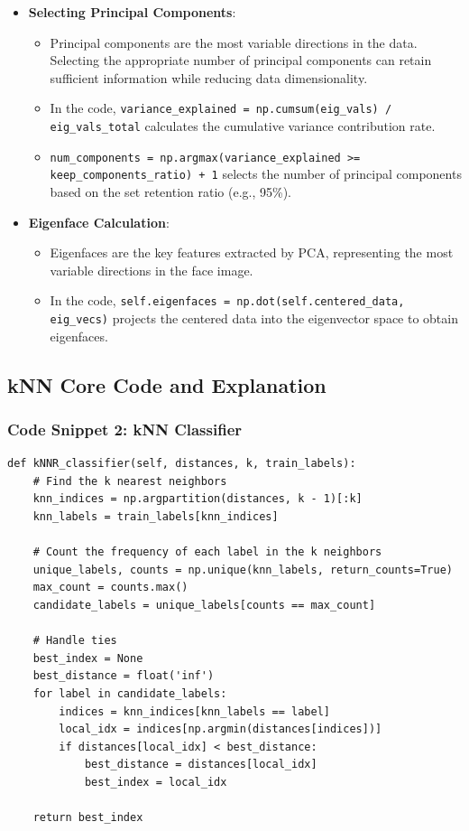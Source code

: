 \documentclass{article}
\begin{document}
\begin{itemize}
\begin{itemize}
    \end{itemize}
    \item \textbf{Selecting Principal Components}:
    \begin{itemize}
        \item Principal components are the most variable directions in the data. Selecting the appropriate number of principal components can retain sufficient information while reducing data dimensionality.
        \item In the code, \texttt{variance\_explained = np.cumsum(eig\_vals) / eig\_vals\_total} calculates the cumulative variance contribution rate.
        \item \texttt{num\_components = np.argmax(variance\_explained >= keep\_components\_ratio) + 1} selects the number of principal components based on the set retention ratio (e.g., 95\%).
    \end{itemize}
    \item \textbf{Eigenface Calculation}:
    \begin{itemize}
        \item Eigenfaces are the key features extracted by PCA, representing the most variable directions in the face image.
        \item In the code, \texttt{self.eigenfaces = np.dot(self.centered\_data, eig\_vecs)} projects the centered data into the eigenvector space to obtain eigenfaces.
    \end{itemize}
\end{itemize}

\subsection{kNN Core Code and Explanation}

\subsubsection{Code Snippet 2: kNN Classifier}
\begin{lstlisting}[basicstyle=\scriptsize\ttfamily, linewidth=\textwidth]
def kNNR_classifier(self, distances, k, train_labels):
    # Find the k nearest neighbors
    knn_indices = np.argpartition(distances, k - 1)[:k]
    knn_labels = train_labels[knn_indices]

    # Count the frequency of each label in the k neighbors
    unique_labels, counts = np.unique(knn_labels, return_counts=True)
    max_count = counts.max()
    candidate_labels = unique_labels[counts == max_count]

    # Handle ties
    best_index = None
    best_distance = float('inf')
    for label in candidate_labels:
        indices = knn_indices[knn_labels == label]
        local_idx = indices[np.argmin(distances[indices])]
        if distances[local_idx] < best_distance:
            best_distance = distances[local_idx]
            best_index = local_idx

    return best_index
\end{lstlisting}
\end{document}
